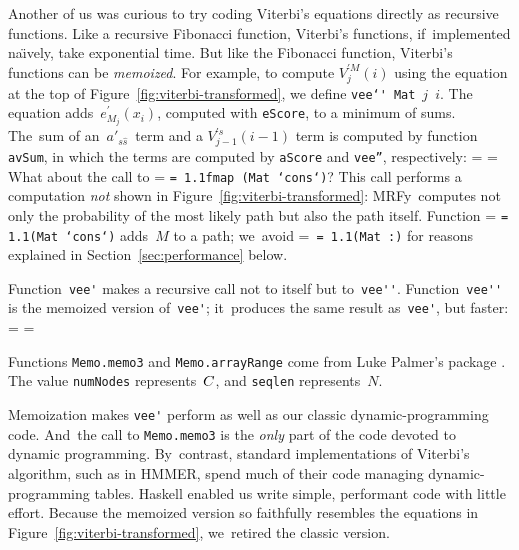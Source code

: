 \documentclass[]{jfp1}
\makeatletter
\newcommand\mrfy{MRFy} %
\newcommand\alignwidth{\ensuremath C} %
\newcommand\naive{na\"\i ve}
\newcommand\figref[1]{Figure~\ref{fig:#1}}
\newcommand\secref[1]{Section~\ref{sec:#1}}
\newif\ifverbatimsmall
\newcommand{\mono}[1]{%
  {\@tempdima = \fontdimen2\font
   \texttt{\spaceskip = 1.1\@tempdima #1}}}
\newcommand\smallverbatiminput[1]{%
  \verbatimsmalltrue
  \presvtopsep=\topsep
  \topsep=0.78\topsep
  \verbatimsmallfalse
  \topsep=\presvtopsep
}
\newcommand\smallfuzzverbatiminput[2]{%
  \hfuzz=#1 \smallverbatiminput{#2}\hfuzz=0pt }
\makeatother
\begin{document}
Another of us was curious to try coding Viterbi's equations
directly as recursive functions.
Like a recursive Fibonacci function, Viterbi's functions,
if~implemented \naive ly,
take exponential time.
But like the Fibonacci function, Viterbi's functions can be
\emph{memoized}.
For example, to compute $V_j^{\prime M}(i)$ using the equation at the top
of \figref{viterbi-transformed}, we define
\mbox{\texttt{vee\char`\'} \texttt{Mat} $j$ $i$}.
The equation adds~$e^{\prime}_{M_{j}}(x_{i})$, computed
with \texttt{eScore}, to a minimum of sums.
The~sum of an~$a'_{s\hat s}$~term and a $V^{\prime s}_{j-1}(i-1)$ term 
is computed by function \texttt{avSum}, in which
the terms are computed by \texttt{aScore} and \texttt{vee''},
respectively:\label{code:vee-prime} 
\smallfuzzverbatiminput{2.9pt}{vfix}
What about the call to
\mono{\mbox{fmap (Mat `cons`)}}?
This call performs a computation \emph{not} shown
in \figref{viterbi-transformed}:
\mrfy\ computes not only the {probability} of the most likely path but 
also the path itself.
Function \mono{(Mat `cons`)} adds~$M$ to a path;
we~avoid \mbox{\mono{(Mat :)}} for reasons explained
in \secref{performance} below. 

Function~\verb+vee'+ makes a recursive call not to itself but
to~\verb+vee''+. 
Function~\verb+vee''+ is the {memoized} version of~\verb+vee'+;
it~produces the same result as~\verb+vee'+,
but faster: 
\smallverbatiminput{memo}
Functions \texttt{Memo.memo3} and \texttt{Memo.arrayRange} come from
Luke Palmer's
package
.
The value
\texttt{numNodes} represents~$\alignwidth$,
and \texttt{seqlen} represents~$N$.

Memoization makes \verb+vee'+ perform as well as our classic
dynamic-programming code.
And~the call to \texttt{Memo.memo3} is the \emph{only} part of the code
devoted to dynamic programming.
By~contrast, standard implementations of Viterbi's algorithm, such as in HMMER,
spend much of their code 
managing dynamic-programming tables.
Haskell enabled us write simple, performant code with little effort.
%
Because the memoized version so faithfully resembles the equations in
\figref{viterbi-transformed}, we~retired the classic version.



\end{document}
